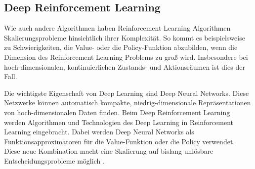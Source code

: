     
    


\subsection{Deep Reinforcement Learning}
Wie auch andere Algorithmen haben Reinforcement Learning Algorithmen Skalierungsprobleme hinsichtlich ihrer Komplexität.
So kommt es beispielsweise zu Schwierigkeiten, die Value- oder die Policy-Funktion abzubilden, wenn die Dimension des Reinforcement Learning Problems zu groß wird.
Insbesondere bei hoch-dimensionalen, kontinuierlichen Zustands- und Aktionsräumen ist dies der Fall.

Die wichtigste Eigenschaft von Deep Learning sind Deep Neural Networks.
Diese Netzwerke können automatisch kompakte, niedrig-dimensionale Repräsentationen von hoch-dimensionalen Daten finden.
Beim Deep Reinforcement Learning werden Algorithmen und Technologien des Deep Learning in Reinforcement Learning eingebracht.
Dabei werden Deep Neural Networks als Funktionsapproximatoren für die Value-Funktion oder die Policy verwendet.
Diese neue Kombination macht eine Skalierung auf bislang unlösbare Entscheidungsprobleme möglich \cite{Arulkumaran2017}.

